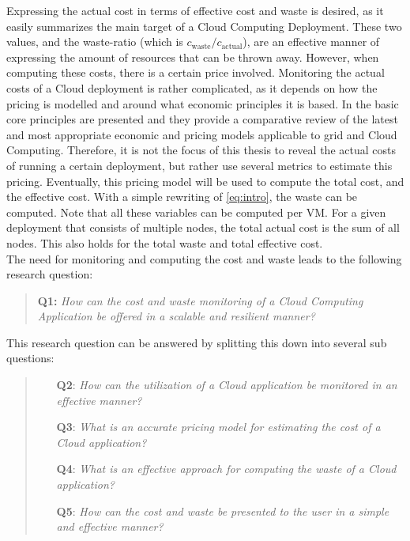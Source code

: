 \noindent
Expressing the actual cost in terms of effective cost and waste is desired, as it easily summarizes the main target of a Cloud Computing Deployment. These two values, and the waste-ratio (which is $c_\text{waste} / c_\text{actual}$), are an effective manner of expressing the amount of resources that can be thrown away. However, when computing these costs, there is a certain price involved. Monitoring the actual costs of a Cloud deployment is rather complicated, as it depends on how the pricing is modelled and around what economic principles it is based. In \cite{samimi2011review} the basic core principles are presented and they provide a comparative review of the latest and most appropriate economic and pricing models applicable to grid and Cloud Computing. Therefore, it is not the focus of this thesis to reveal the actual costs of running a certain deployment, but rather use several metrics to estimate this pricing. Eventually, this pricing model will be used to compute the total cost, and the effective cost. With a simple rewriting of \autoref{eq:intro}, the waste can be computed. Note that all these variables can be computed per VM. For a given deployment that consists of multiple nodes, the total actual cost is the sum of all nodes. This also holds for the total waste and total effective cost.\\

\noindent
The need for monitoring and computing the cost and waste leads to the following research question:

\begin{quote}
\textbf{Q1: }\textit{How can the cost and waste monitoring of a Cloud Computing Application be offered in a scalable and resilient manner?}
\end{quote}
\noindent
This research question can be answered by splitting this down into several sub questions:

\begin{quote}
    \begin{itemize}
        \item[\textbf{Q2}: ]\textit{How can the utilization of a Cloud application be monitored in an effective manner?}
        \item[\textbf{Q3}: ]\textit{What is an accurate pricing model for estimating the cost of a Cloud application?}
        \item[\textbf{Q4}: ]\textit{What is an effective approach for computing the waste of a Cloud application?}
        \item[\textbf{Q5}: ]\textit{How can the cost and waste be presented to the user in a simple and effective manner?}
    \end{itemize}
\end{quote}

